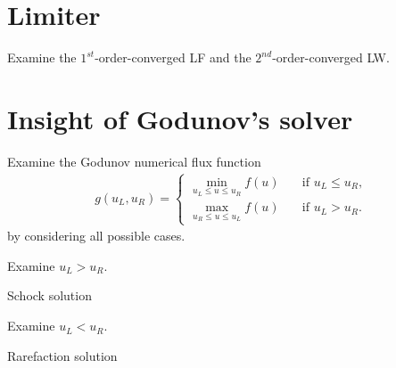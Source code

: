 \documentclass[12pt]{article}
\begin{document}
\section{Limiter}
\begin{example}
	Examine the $1^{st}$-order-converged LF and the $2^{nd}$-order-converged LW.
\end{example}

\clearpage
\section{Insight of Godunov's solver}
\begin{example}
	Examine the Godunov numerical flux function
	\begin{align*}
		g(u_L,u_R)
		=
		\begin{cases}
			\underset{ u_L \leq u \leq u_R}{\min}  f(u) \quad & \text{if } u_L \leq u_R , \\
			\underset{ u_R \leq u \leq u_L}{\max}  f(u) \quad & \text{if } u_L > u_R.
		\end{cases}
	\end{align*}
    by considering all possible cases.
\end{example}

\clearpage
\begin{example}
	Examine $u_{L} > u_{R}$.
\end{example}
Schock solution

\clearpage
\begin{example}
	Examine $u_{L} < u_{R}$.
\end{example}
Rarefaction solution
\end{document}
